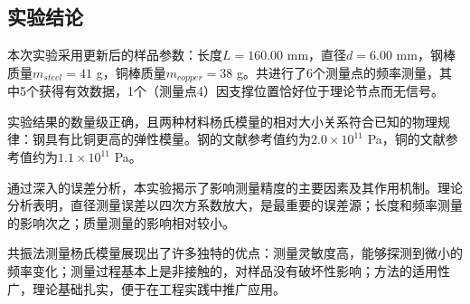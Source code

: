 ﻿\documentclass[12pt,a4paper]{article}
\begin{document}
\subsection{实验结论}

本次实验采用更新后的样品参数：长度$L = 160.00$ mm，直径$d = 6.00$ mm，钢棒质量$m_{steel} = 41$ g，铜棒质量$m_{copper} = 38$ g。共进行了6个测量点的频率测量，其中5个获得有效数据，1个（测量点4）因支撑位置恰好位于理论节点而无信号。

实验结果的数量级正确，且两种材料杨氏模量的相对大小关系符合已知的物理规律：钢具有比铜更高的弹性模量。钢的文献参考值约为$2.0 \times 10^{11}$ Pa，铜的文献参考值约为$1.1 \times 10^{11}$ Pa。

通过深入的误差分析，本实验揭示了影响测量精度的主要因素及其作用机制。理论分析表明，直径测量误差以四次方系数放大，是最重要的误差源；长度和频率测量的影响次之；质量测量的影响相对较小。

共振法测量杨氏模量展现出了许多独特的优点：测量灵敏度高，能够探测到微小的频率变化；测量过程基本上是非接触的，对样品没有破坏性影响；方法的适用性广，理论基础扎实，便于在工程实践中推广应用。
\end{document}
